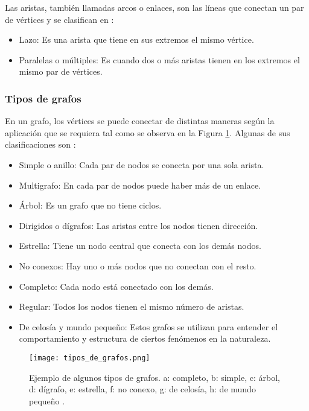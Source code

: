 Las aristas, también llamadas arcos o enlaces, son las líneas que conectan un par de vértices y se clasifican en \cite{teoria_de_grafos}:

\begin{itemize}
	\item Lazo: Es una arista que tiene en sus extremos el mismo vértice. 
	\item Paralelas o múltiples: Es cuando dos o más aristas tienen en los extremos el mismo par de vértices.
\end{itemize}

\subsubsection*{Tipos de grafos}
En un grafo, los vértices se puede conectar de distintas maneras según la aplicación que se requiera tal como se observa en la Figura \ref{fig:tipos_de_grafos}. Algunas de sus clasificaciones son \cite{tipos_de_grafos}:

\begin{itemize}
	\item Simple o anillo: Cada par de nodos se conecta por una sola arista.
	\item Multigrafo: En cada par de nodos puede haber más de un enlace.
	\item Árbol: Es un grafo que no tiene ciclos.
	\item Dirigidos o dígrafos: Las aristas entre los nodos tienen dirección.
	\item Estrella: Tiene un nodo central que conecta con los demás nodos.
	\item No conexos: Hay uno o más nodos que no conectan con el resto.
	\item Completo: Cada nodo está conectado con los demás.
	\item Regular: Todos los nodos tienen el mismo número de aristas.
	\item De celosía y mundo pequeño: Estos grafos se utilizan para entender el comportamiento y estructura de ciertos fenómenos en la naturaleza.
\end{itemize}

\begin{figure}[H]
	\centering
	\texttt{[image: tipos\_de\_grafos.png]}
	\caption{Ejemplo de algunos tipos de grafos. a: completo, b: simple, c: árbol, d: dígrafo, e: estrella, f: no conexo, g: de celosía, h: de mundo pequeño \cite{tipos_de_grafos}.}
	\label{fig:tipos_de_grafos}
\end{figure}

